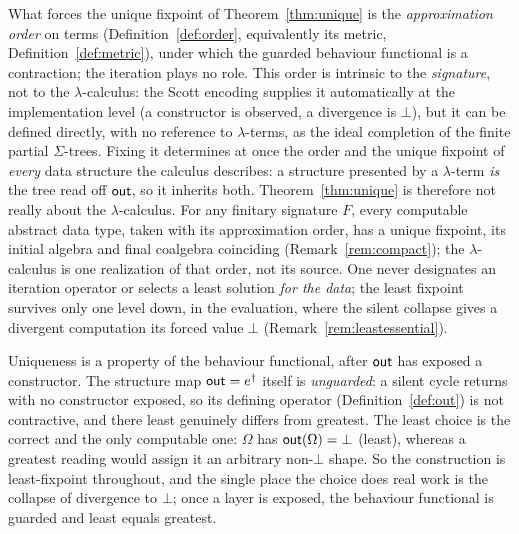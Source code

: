 \begin{remark}\label{rem:metalanguage}
  What forces the unique fixpoint of Theorem~\ref{thm:unique} is the \emph{approximation order} on terms
  (Definition~\ref{def:order}, equivalently its metric, Definition~\ref{def:metric}), under which the
  guarded behaviour functional is a contraction; the iteration plays no role. This order is intrinsic to the
  \emph{signature}, not to the $\lambda$-calculus: the Scott encoding supplies it automatically at the
  implementation level (a constructor is observed, a divergence is $\bot$), but it can be defined
  directly, with no reference to $\lambda$-terms, as the ideal completion of the finite partial
  $\Sigma$-trees. Fixing it determines at once the order and the unique fixpoint of \emph{every} data
  structure the calculus describes: a structure presented by a $\lambda$-term \emph{is} the tree read off
  $\mathsf{out}$, so it inherits both. Theorem~\ref{thm:unique} is therefore not really about the
  $\lambda$-calculus. For any finitary signature $F$, every computable abstract data type, taken with its
  approximation order, has a unique fixpoint, its initial algebra and final coalgebra coinciding
  (Remark~\ref{rem:compact}); the $\lambda$-calculus is one realization of that order, not its source.
  One never designates an iteration operator or selects a least solution \emph{for the data}; the least
  fixpoint survives only one level down, in the evaluation, where the silent collapse gives a divergent
  computation its forced value $\bot$ (Remark~\ref{rem:leastessential}).
\end{remark}

\begin{remark}\label{rem:leastessential}
  Uniqueness is a property of the behaviour functional, after $\mathsf{out}$ has exposed a constructor. The structure map
  $\mathsf{out} = e^{\dagger}$ itself is \emph{unguarded}: a silent cycle returns with no constructor exposed,
  so its defining operator (Definition~\ref{def:out}) is not contractive, and there least genuinely
  differs from greatest. The least choice is the correct and the only computable one: $\Omega$ has
  $\mathsf{out}(\Omega) = \bot$ (least), whereas a greatest reading would assign it an arbitrary non-$\bot$
  shape. So the construction is least-fixpoint throughout, and the single place the choice does real work
  is the collapse of divergence to $\bot$; once a layer is exposed, the behaviour functional is guarded and least
  equals greatest.
\end{remark}

